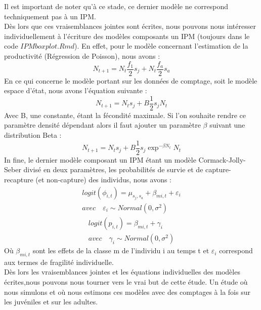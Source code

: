 \documentclass[12pt,a4paper]{article}
\begin{document}
Il est important de noter qu'à ce stade, ce dernier modèle ne correspond techniquement pas à un IPM.\\
Dès lors que ces vraisemblances jointes sont écrites, nous pouvons nous intéresser individuellement à l'écriture des modèles composants un IPM (toujours dans le code $IPMboxplot.Rmd$). En effet, pour le modèle concernant l'estimation de la productivité (Régression de Poisson), nous avons :
\begin{equation}
N_{t+1}=N_{t}\dfrac{f_1}{2}s_{j}+N_{t}\dfrac{f_a}{2}s_{a}
\end{equation}
En ce qui concerne le modèle portant sur les données de comptage, soit le modèle espace d'état, nous avons l'équation suivante : 
\begin{equation}
N_{t+1}=N_{t}s_{j}+B\dfrac{1}{2}s_{j}N_t
\end{equation}
Avec B, une constante, étant la fécondité maximale. Si l'on souhaite rendre ce paramètre densité dépendant alors il faut ajouter un paramètre $\beta$ suivant une distribution Beta : 
\begin{equation}
N_{t+1}=N_{t}s_{j}+B\dfrac{1}{2}s_{j}\exp^{-\beta N_{t}} N_t
\end{equation}
In fine, le dernier modèle composant un IPM étant un modèle Cormack-Jolly-Seber divisé en deux paramètres, les probabilités de survie et de capture-recapture (et non-capture) des individus, nous avons :
\begin{equation}
\begin{aligned}
logit(\phi_{i,t})= \mu_{s_{j}, s_{a}}+\beta_{m{i, t}}+\varepsilon_i \\
avec \quad \varepsilon_{i} \sim Normal(0, \sigma^2)
\end{aligned}
\end{equation}
\begin{equation}
\begin{aligned}
logit(p_{i,t})= \beta_{m{i, t}}+ \gamma_{i} \\
avec \quad  \gamma_{i}\sim Normal(0, \sigma^2)
\end{aligned}
\end{equation}
Où $\beta_{m{i, t}}$ sont les effets de la classe m de l'individu i au temps t et $\varepsilon_i$ correspond aux termes de fragilité individuelle.\\
Dès lors les vraisemblances jointes et les équations individuelles des modèles écrites,nous pouvons nous tourner vers le vrai but de cette étude. Un étude où nous simulons et où nous estimons ces modèles avec des comptages à la fois sur les juvéniles et sur les adultes.
\end{document}
